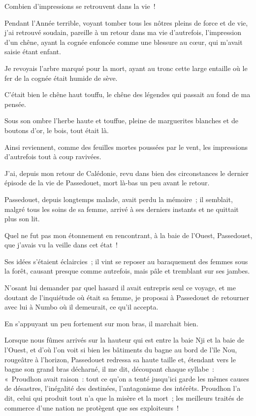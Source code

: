 \documentclass[french,twoside]{book} %
\begin{document}
\noindent Combien d’impressions se retrouvent dans la vie !\par
Pendant l’Année terrible, voyant tomber tous les nôtres pleins de force et de vie, j’ai retrouvé soudain, pareille à un retour dans ma vie d’autrefois, l’impression d’un chêne, ayant la cognée enfoncée comme une blessure au cœur, qui m’avait saisie étant enfant.\par
Je revoyais l’arbre marqué pour la mort, ayant  au tronc cette large entaille où le fer de la cognée était humide de sève.\par
C’était bien le chêne haut touffu, le chêne des légendes qui passait au fond de ma pensée.\par
Sous son ombre l’herbe haute et touffue, pleine de marguerites blanches et de boutons d’or, le bois, tout était là.\par
Ainsi reviennent, comme des feuilles mortes poussées par le vent, les impressions d’autrefois tout à coup ravivées.\par
J’ai, depuis mon retour de Calédonie, revu dans bien des circonstances le dernier épisode de la vie de Passedouet, mort là-bas un peu avant le retour.\par
Passedouet, depuis longtemps malade, avait perdu la mémoire ; il semblait, malgré tous les soins de sa femme, arrivé à ses derniers instants et ne quittait plus son lit.\par
Quel ne fut pas mon étonnement en rencontrant, à la baie de l’Ouest, Passedouet, que j’avais vu la veille dans cet état !\par
Ses idées s’étaient éclaircies ; il vint se reposer au baraquement des femmes sous la forêt, causant presque comme autrefois, mais pâle et tremblant sur ses jambes.\par
N’osant lui demander par quel hasard il avait entrepris seul ce voyage, et me doutant de l’inquiétude  où était sa femme, je proposai à Passedouet de retourner avec lui à Numbo où il demeurait, ce qu’il accepta.\par
En s’appuyant un peu fortement sur mon bras, il marchait bien.\par
Lorsque nous fûmes arrivés sur la hauteur qui est entre la baie Nji et la baie de l’Ouest, et d’où l’on voit si bien les bâtiments du bagne au bord de l’île Nou, rougeâtre à l’horizon, Passedouet redressa sa haute taille et, étendant vers le bagne son grand bras décharné, il me dit, découpant chaque syllabe : « Proudhon avait raison : tout ce qu’on a tenté jusqu’ici garde les mêmes causes de désastres, l’inégalité des destinées, l’antagonisme des intérêts. Proudhon l’a dit, celui qui produit tout n’a que la misère et la mort ; les meilleurs traités de commerce d’une nation ne protègent que ses exploiteurs !\par
\end{document}
